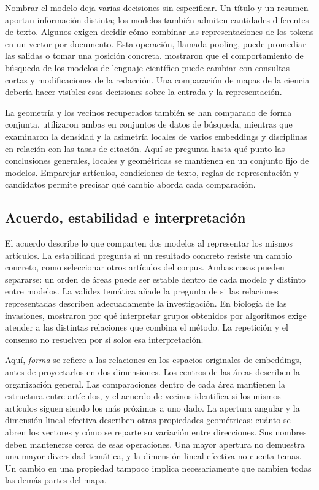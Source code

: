 \documentclass[12pt]{article}
\begin{document}
Nombrar el modelo deja varias decisiones sin especificar. Un título y un resumen aportan información distinta; los modelos también admiten cantidades diferentes de texto. Algunos exigen decidir cómo combinar las representaciones de los tokens en un vector por documento. Esta operación, llamada pooling, puede promediar las salidas o tomar una posición concreta. \citet{singh-singh-2022-inefficiency} mostraron que el comportamiento de búsqueda de los modelos de lenguaje científico puede cambiar con consultas cortas y modificaciones de la redacción. Una comparación de mapas de la ciencia debería hacer visibles esas decisiones sobre la entrada y la representación.

La geometría y los vecinos recuperados también se han comparado de forma conjunta. \citet{ref4e1e0d5582} utilizaron ambas en conjuntos de datos de búsqueda, mientras que \citet{ref6da178065c} examinaron la densidad y la asimetría locales de varios embeddings y disciplinas en relación con las tasas de citación. Aquí se pregunta hasta qué punto las conclusiones generales, locales y geométricas se mantienen en un conjunto fijo de modelos. Emparejar artículos, condiciones de texto, reglas de representación y candidatos permite precisar qué cambio aborda cada comparación.

\subsection{Acuerdo, estabilidad e interpretación}
El acuerdo describe lo que comparten dos modelos al representar los mismos artículos. La estabilidad pregunta si un resultado concreto resiste un cambio concreto, como seleccionar otros artículos del corpus. Ambas cosas pueden separarse: un orden de áreas puede ser estable dentro de cada modelo y distinto entre modelos. La validez temática añade la pregunta de si las relaciones representadas describen adecuadamente la investigación. En biología de las invasiones, \citet{QSSreviewQ17} mostraron por qué interpretar grupos obtenidos por algoritmos exige atender a las distintas relaciones que combina el método. La repetición y el consenso no resuelven por sí solos esa interpretación.

Aquí, \emph{forma} se refiere a las relaciones en los espacios originales de embeddings, antes de proyectarlos en dos dimensiones. Los centros de las áreas describen la organización general. Las comparaciones dentro de cada área mantienen la estructura entre artículos, y el acuerdo de vecinos identifica si los mismos artículos siguen siendo los más próximos a uno dado. La apertura angular y la dimensión lineal efectiva describen otras propiedades geométricas: cuánto se abren los vectores y cómo se reparte su variación entre direcciones. Sus nombres deben mantenerse cerca de esas operaciones. Una mayor apertura no demuestra una mayor diversidad temática, y la dimensión lineal efectiva no cuenta temas. Un cambio en una propiedad tampoco implica necesariamente que cambien todas las demás partes del mapa.
\end{document}
